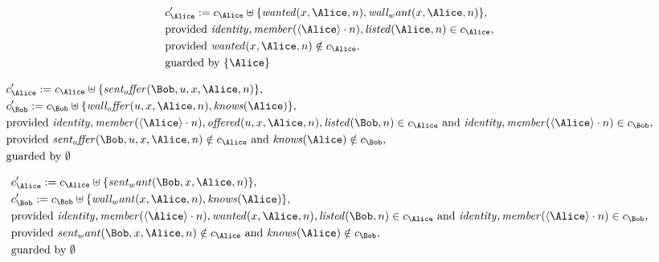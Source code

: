 \begin{align*}
&
c'_
{
\Alice
}
 := 
c_
{
\Alice
}
 \uplus 
\{
\mathit{
wanted
}
(
x
,
\Alice
,
n
)
,
\mathit{
wall_want
}
(
x
,
\Alice
,
n
)
\}
,\\
&
\text{provided } 
\mathit{
identity
}
,
\mathit{
member
}
(
\langle
\Alice
\rangle
\cdot
n
)
,
\mathit{
listed
}
(
\Alice
,
n
)
 \in c_
{
\Alice
}
,\\
&
\text{provided } 
\mathit{
wanted
}
(
x
,
\Alice
,
n
)
 \notin c_
{
\Alice
}
,\\
&
\text{guarded by } \{
\Alice
\}
\end{align*}

\begin{align*}
&
c'_
{
\Alice
}
 := 
c_
{
\Alice
}
 \uplus 
\{
\mathit{
sent_offer
}
(
\Bob
,
u
,
x
,
\Alice
,
n
)
\}
,\\
&
c'_
{
\Bob
}
 := 
c_
{
\Bob
}
 \uplus 
\{
\mathit{
wall_offer
}
(
u
,
x
,
\Alice
,
n
)
,
\mathit{
knows
}
(
\Alice
)
\}
,\\
&
\text{provided } 
\mathit{
identity
}
,
\mathit{
member
}
(
\langle
\Alice
\rangle
\cdot
n
)
,
\mathit{
offered
}
(
u
,
x
,
\Alice
,
n
)
,
\mathit{
listed
}
(
\Bob
,
n
)
 \in c_
{
\Alice
}
 \text{ and } 
\mathit{
identity
}
,
\mathit{
member
}
(
\langle
\Alice
\rangle
\cdot
n
)
 \in c_
{
\Bob
}
,\\
&
\text{provided } 
\mathit{
sent_offer
}
(
\Bob
,
u
,
x
,
\Alice
,
n
)
 \notin c_
{
\Alice
}
 \text{ and } 
\mathit{
knows
}
(
\Alice
)
 \notin c_
{
\Bob
}
,\\
&
\text{guarded by } \emptyset
\end{align*}

\begin{align*}
&
c'_
{
\Alice
}
 := 
c_
{
\Alice
}
 \uplus 
\{
\mathit{
sent_want
}
(
\Bob
,
x
,
\Alice
,
n
)
\}
,\\
&
c'_
{
\Bob
}
 := 
c_
{
\Bob
}
 \uplus 
\{
\mathit{
wall_want
}
(
x
,
\Alice
,
n
)
,
\mathit{
knows
}
(
\Alice
)
\}
,\\
&
\text{provided } 
\mathit{
identity
}
,
\mathit{
member
}
(
\langle
\Alice
\rangle
\cdot
n
)
,
\mathit{
wanted
}
(
x
,
\Alice
,
n
)
,
\mathit{
listed
}
(
\Bob
,
n
)
 \in c_
{
\Alice
}
 \text{ and } 
\mathit{
identity
}
,
\mathit{
member
}
(
\langle
\Alice
\rangle
\cdot
n
)
 \in c_
{
\Bob
}
,\\
&
\text{provided } 
\mathit{
sent_want
}
(
\Bob
,
x
,
\Alice
,
n
)
 \notin c_
{
\Alice
}
 \text{ and } 
\mathit{
knows
}
(
\Alice
)
 \notin c_
{
\Bob
}
,\\
&
\text{guarded by } \emptyset
\end{align*}
